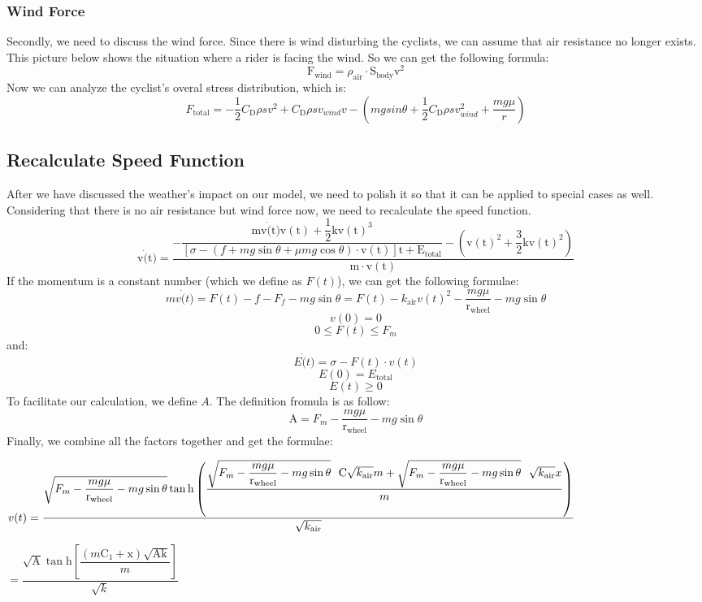 \documentclass[12pt]{article}
\theoremstyle{definition}
\theoremstyle{remark}
\numberwithin{equation}{section}
\begin{document}
	\subsubsection{Wind Force}
	Secondly, we need to discuss the wind force. Since there is wind disturbing the cyclists, we can assume that air resistance no longer exists. This picture below shows the situation where a rider is facing the wind. So we can get the following formula:
	$$\mathrm{F}_\mathrm{wind}=\rho_\mathrm{air}\cdot\mathrm{S}_\mathrm{body}\mathrm{v}^2$$
	Now we can analyze the cyclist's overal stress distribution, which is:
	$$F_\mathrm{total}=-\frac{1}{2}C_\mathrm{D}\rho sv^2+C_\mathrm{D}\rho sv_{wind}v-(mgsin\theta+\frac{1}{2}C_\mathrm{D}\rho sv_{wind}^2+\frac{mg\mu}{r})$$
	\subsection{Recalculate Speed Function}
	After we have discussed the weather's impact on our model, we need to polish it so that it can be applied to special cases as well. Considering that there is no air resistance but wind force now, we need to recalculate the speed function.
	$$\mathrm{v}\dot(\mathrm{t})=\dfrac{-\dfrac{\mathrm{m}\mathrm{v}\dot(\mathrm{t})\mathrm{v}(\mathrm{t})+\dfrac{1}{2}\mathrm{k}{\mathrm{v}(\mathrm{t})}^3}{\left[\sigma-\left(f+mg \sin \theta+\mu mg \cos \theta\right)\cdot\mathrm{v}(\mathrm{t})\right]\mathrm{t}+\mathrm{E}_\mathrm{total}}-\left(\mathrm{v}(\mathrm{t})^2+\dfrac{3}{2}\mathrm{k}\mathrm{v}(\mathrm{t})^2\right)}{\mathrm{m}\cdot\mathrm{v}(\mathrm{t})}$$
	If the momentum is a constant number (which we define as $F(t)$), we can get the following formulae:
	$$mv\dot(t)=F(t)-f-F_{f}-mg\sin \theta=F(t)- k _\mathrm{air}{v(t)}^2-\dfrac{mg\mu}{\mathrm{r}_\mathrm{wheel}}-mg\sin \theta$$
	$$v(0)=0$$
	$$0\leq F(t)\leq F_{m}$$
	and:
	$$ E \dot(t)=\sigma-F(t)\cdot v(t)$$
	$$ E (0)= E _\mathrm{total}$$
	$$ E (t)\geq0$$
	To facilitate our calculation, we define $A$. The definition fromula is as follow:
	$$\mathrm{A}=F_m-\dfrac{mg\mu}{\mathrm{r}_\mathrm{wheel}}-mg\sin \theta$$
	Finally, we combine all the factors together and get the formulae:

	\begin{footnotesize}
		$v(t)\\=\dfrac{\sqrt{F_m-\dfrac{mg\mu}{\mathrm{r}_\mathrm{wheel}}-mg\sin \theta} \tan \mathrm{h} \left(\dfrac{\sqrt{F_m-\dfrac{mg\mu}{\mathrm{r}_\mathrm{wheel}}-mg\sin \theta}\ \ \mathrm{C}\sqrt{ k _\mathrm{air}} m+\sqrt{F_m-\dfrac{mg\mu}{\mathrm{r}_\mathrm{wheel}}-mg\sin \theta}\ \ \sqrt{ k _\mathrm{air}} x}{m}\right)}{\sqrt{ k _\mathrm{air}}}$

		$=\dfrac{\sqrt{\mathrm{A}} \tan \mathrm{h}\left[\dfrac{\left(m\mathrm{C}_1+\mathrm{x}\right)\sqrt{\mathrm{Ak}}}{m}\right]}{\sqrt{ k }}$
	\end{footnotesize}
\end{document}
